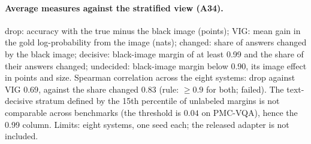 \paragraph{Average measures against the stratified view (A34).}
\begin{center}
\footnotesize
\setlength{\tabcolsep}{3pt}
\end{center}
drop: accuracy with the true minus the black image (points); VIG: mean gain in the gold log-probability from the image (nats); changed: share of answers changed by the black image; decisive: black-image margin of at least 0.99 and the share of their answers changed; undecided: black-image margin below 0.90, its image effect in points and size.
Spearman correlation across the eight systems: drop against VIG $0.69$, against the share changed $0.83$ (rule: $\ge0.9$ for both; failed).
The text-decisive stratum defined by the 15th percentile of unlabeled margins is not comparable across benchmarks (the threshold is $0.04$ on PMC-VQA), hence the 0.99 column.
Limits: eight systems, one seed each; the released adapter is not included.

